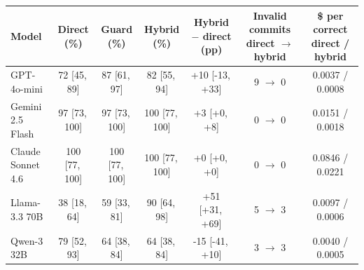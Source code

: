 \begin{tabular}{lcccccc}
\toprule
Model & \makecell{Direct\\(\%)} & \makecell{Guard\\(\%)} & \makecell{Hybrid\\(\%)} & \makecell{Hybrid $-$ direct\\(pp)} & \makecell{Invalid commits\\direct $\to$ hybrid} & \makecell{\$ per correct\\direct / hybrid} \\
\midrule
GPT-4o-mini & 72 [45,\,89] & 87 [61,\,97] & 82 [55,\,94] & +10 [-13,\,+33] & 9 $\to$ 0 & 0.0037 / 0.0008 \\
Gemini 2.5 Flash & 97 [73,\,100] & 97 [73,\,100] & 100 [77,\,100] & +3 [+0,\,+8] & 0 $\to$ 0 & 0.0151 / 0.0018 \\
Claude Sonnet 4.6 & 100 [77,\,100] & 100 [77,\,100] & 100 [77,\,100] & +0 [+0,\,+0] & 0 $\to$ 0 & 0.0846 / 0.0221 \\
\midrule
Llama-3.3 70B & 38 [18,\,64] & 59 [33,\,81] & 90 [64,\,98] & +51 [+31,\,+69] & 5 $\to$ 3 & 0.0097 / 0.0006 \\
Qwen-3 32B & 79 [52,\,93] & 64 [38,\,84] & 64 [38,\,84] & -15 [-41,\,+10] & 3 $\to$ 3 & 0.0040 / 0.0005 \\
\bottomrule
\end{tabular}
